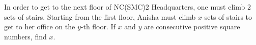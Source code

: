 In order to get to the next floor of NC(SMC)2 Headquarters, one must climb $2$ sets of stairs. Starting from the first floor, Anisha must climb $x$ sets of stairs to get to her office on the $y$-th floor. If $x$ and $y$ are consecutive positive square numbers, find $x$.
